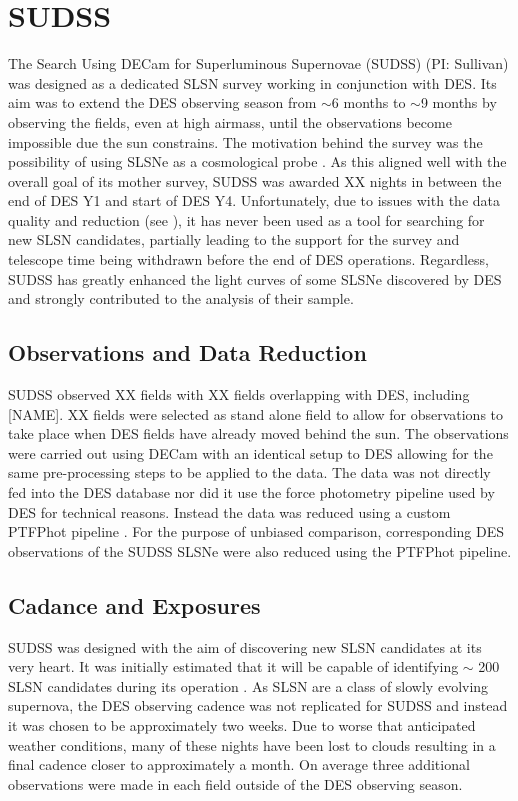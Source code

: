 \section{SUDSS}
The Search Using DECam for Superluminous Supernovae (SUDSS) (PI: Sullivan) was designed as a dedicated SLSN survey working in conjunction with DES. Its aim was to extend the DES observing season from $\sim$6 months to $\sim$9 months by observing the fields, even at high airmass, until the observations become impossible due the sun constrains. The motivation behind the survey was the possibility of using SLSNe as a cosmological probe \citep{Inserra2014}. As this aligned well with the overall goal of its mother survey, SUDSS was awarded XX nights in between the end of DES Y1 and start of DES Y4. Unfortunately, due to issues with the data quality and reduction (see ), it has never been used as a tool for searching for new SLSN candidates, partially leading to the support for the survey and telescope time being withdrawn before the end of DES operations. Regardless, SUDSS has greatly enhanced the light curves of some SLSNe discovered by DES and strongly contributed to the analysis of their sample.

\subsection{Observations and Data Reduction}
SUDSS observed XX fields with XX fields overlapping with DES, including [NAME]. XX fields were selected as stand alone field to allow for observations to take place when DES fields have already moved behind the sun. The observations were carried out using DECam with an identical setup to DES allowing for the same pre-processing steps to be applied to the data. The data was not directly fed into the DES database nor did it use the force photometry pipeline used by DES for technical reasons. Instead the data was reduced using a custom PTFPhot pipeline \citep{Firth2015}. For the purpose of unbiased comparison, corresponding DES observations of the SUDSS SLSNe were also reduced using the PTFPhot pipeline.

\subsection{Cadance and Exposures}
\label{sec:SUDSSCadance}
SUDSS was designed with the aim of discovering new SLSN candidates at its very heart. It was initially estimated that it will be capable of identifying $\sim$ 200 SLSN candidates during its operation \citep{Papadopoulos2015}. As SLSN are a class of slowly evolving supernova, the DES observing cadence was not replicated for SUDSS and instead it was chosen to be approximately two weeks. Due to worse that anticipated weather conditions, many of these nights have been lost to clouds resulting in a final cadence closer to approximately a month. On average three additional observations were made in each field outside of the DES observing season.


